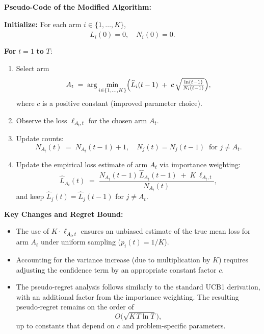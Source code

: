 \medskip
\textbf{Pseudo-Code of the Modified Algorithm:}

\bigskip
\noindent
\textbf{Initialize:} For each arm $i \in \{1,\dots,K\}$,
\[
    \widehat{L}_i(0) = 0,\quad N_i(0) = 0.
\]

\medskip
\noindent
\textbf{For} $t = 1$ \textbf{to} $T$:
\begin{enumerate}
    \item Select arm 
    \[
        A_t \;=\; \arg\min_{i \in \{1,\dots,K\}} \Bigl(\widehat{L}_i(t-1) \;+\; c \,\sqrt{\tfrac{\ln(t-1)}{N_i(t-1)}}\Bigr),
    \]
    where $c$ is a positive constant (improved parameter choice).
    \item Observe the loss $\ell_{A_t,t}$ for the chosen arm $A_t$.
    \item Update counts:
    \[
        N_{A_t}(t) \;=\; N_{A_t}(t-1) + 1,\quad N_j(t) = N_j(t-1)\;\;\text{for } j \neq A_t.
    \]
    \item Update the empirical loss estimate of arm $A_t$ via importance weighting:
    \[
        \widehat{L}_{A_t}(t) \;=\; \frac{N_{A_t}(t-1)\,\widehat{L}_{A_t}(t-1)\;+\;K \,\ell_{A_t,t}}{N_{A_t}(t)},
    \]
    and keep $\widehat{L}_j(t) = \widehat{L}_j(t-1)$ for $j \neq A_t$.
\end{enumerate}

\bigskip
\noindent
\textbf{Key Changes and Regret Bound:} 
\begin{itemize}
    \item The use of $K \cdot \ell_{A_t,t}$ ensures an unbiased estimate of the true mean loss for arm $A_t$ under uniform sampling ($p_i(t) = 1/K$).
    \item Accounting for the variance increase (due to multiplication by $K$) requires adjusting the confidence term by an appropriate constant factor $c$. 
    \item The pseudo-regret analysis follows similarly to the standard UCB1 derivation, with an additional factor from the importance weighting. The resulting pseudo-regret remains on the order of 
    \[
        O\bigl(\sqrt{K\,T \ln T}\bigr),
    \]
    up to constants that depend on $c$ and problem-specific parameters.
\end{itemize}

